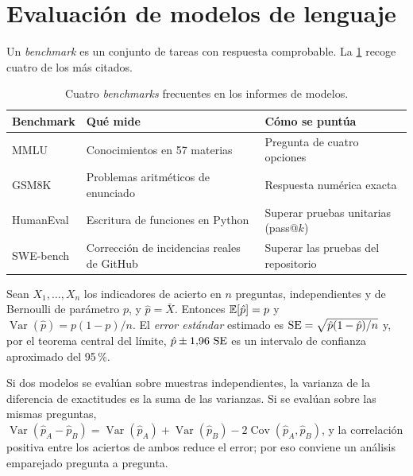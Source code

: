 \section{Evaluación de modelos de lenguaje}
\label{sec:se}

Un \emph{benchmark} es un conjunto de tareas con respuesta comprobable. La \cref{tab:benchmarks} recoge cuatro de los más citados.

\begin{table}[h]
\centering\small
\begin{tabularx}{\textwidth}{@{}l>{\raggedright\arraybackslash}X>{\raggedright\arraybackslash}X@{}}
\toprule
Benchmark & Qué mide & Cómo se puntúa \\
\midrule
MMLU~\cite{mmlu} & Conocimientos en 57 materias & Pregunta de cuatro opciones \\
GSM8K~\cite{gsm8k} & Problemas aritméticos de enunciado & Respuesta numérica exacta \\
HumanEval~\cite{chen-codex} & Escritura de funciones en Python & Superar pruebas unitarias (pass@$k$) \\
SWE-bench~\cite{swebench} & Corrección de incidencias reales de GitHub & Superar las pruebas del repositorio \\
\bottomrule
\end{tabularx}
\caption{Cuatro \emph{benchmarks} frecuentes en los informes de modelos.}
\label{tab:benchmarks}
\end{table}

\begin{proposicion}\label{prop:se}
Sean $X_1,\dots,X_n$ los indicadores de acierto en $n$ preguntas, independientes y de Bernoulli de parámetro $p$, y $\hat p=\bar X$. Entonces $\mathbb{E}[\hat p]=p$ y $\operatorname{Var}(\hat p)=p(1-p)/n$. El \emph{error estándar} estimado es $\operatorname{SE}=\sqrt{\hat p(1-\hat p)/n}$ y, por el teorema central del límite, $\hat p\pm 1{,}96\,\operatorname{SE}$ es un intervalo de confianza aproximado del 95\,\%.
\end{proposicion}

Si dos modelos se evalúan sobre muestras independientes, la varianza de la diferencia de exactitudes es la suma de las varianzas. Si se evalúan sobre las mismas preguntas, $\operatorname{Var}(\hat p_A-\hat p_B)=\operatorname{Var}(\hat p_A)+\operatorname{Var}(\hat p_B)-2\operatorname{Cov}(\hat p_A,\hat p_B)$, y la correlación positiva entre los aciertos de ambos reduce el error; por eso conviene un análisis emparejado pregunta a pregunta.

